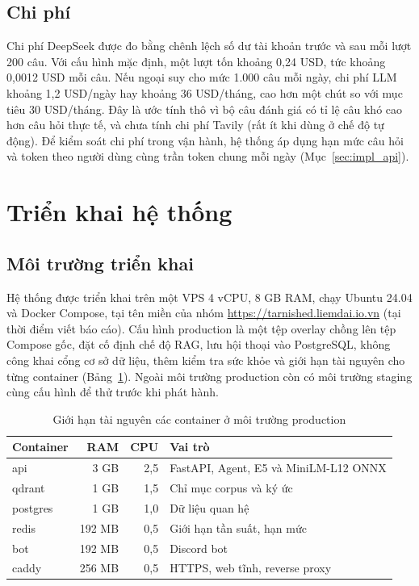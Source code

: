 \subsection{Chi phí}
\label{sec:cost}

Chi phí DeepSeek được đo bằng chênh lệch số dư tài khoản trước và sau mỗi lượt 200 câu. Với cấu hình mặc định, một lượt tốn khoảng 0,24 USD, tức khoảng 0,0012 USD mỗi câu. Nếu ngoại suy cho mức 1.000 câu mỗi ngày, chi phí LLM khoảng 1,2 USD/ngày hay khoảng 36 USD/tháng, cao hơn một chút so với mục tiêu 30 USD/tháng. Đây là ước tính thô vì bộ câu đánh giá có tỉ lệ câu khó cao hơn câu hỏi thực tế, và chưa tính chi phí Tavily (rất ít khi dùng ở chế độ tự động). Để kiểm soát chi phí trong vận hành, hệ thống áp dụng hạn mức câu hỏi và token theo người dùng cùng trần token chung mỗi ngày (Mục~\ref{sec:impl_api}).

\section{Triển khai hệ thống}
\label{sec:deploy}

\subsection{Môi trường triển khai}
\label{sec:deploy_env}

Hệ thống được triển khai trên một VPS 4 vCPU, 8 GB RAM, chạy Ubuntu 24.04 và Docker Compose, tại tên miền của nhóm \url{https://tarnished.liemdai.io.vn} (tại thời điểm viết báo cáo). Cấu hình production là một tệp overlay chồng lên tệp Compose gốc, đặt cố định chế độ RAG, lưu hội thoại vào PostgreSQL, không công khai cổng cơ sở dữ liệu, thêm kiểm tra sức khỏe và giới hạn tài nguyên cho từng container (Bảng~\ref{tab:resources}). Ngoài môi trường production còn có môi trường staging cùng cấu hình để thử trước khi phát hành.

\begin{table}[H]
    \centering
    \caption{Giới hạn tài nguyên các container ở môi trường production}
    \label{tab:resources}
    \small
    \begin{tabular}{|l|r|r|l|}
        \toprule
        \textbf{Container} & \textbf{RAM} & \textbf{CPU} & \textbf{Vai trò} \\
        \midrule
        api & 3 GB & 2,5 & FastAPI, Agent, E5 và MiniLM-L12 ONNX \\ \hline
        qdrant & 1 GB & 1,5 & Chỉ mục corpus và ký ức \\ \hline
        postgres & 1 GB & 1,0 & Dữ liệu quan hệ \\ \hline
        redis & 192 MB & 0,5 & Giới hạn tần suất, hạn mức \\ \hline
        bot & 192 MB & 0,5 & Discord bot \\ \hline
        caddy & 256 MB & 0,5 & HTTPS, web tĩnh, reverse proxy \\
        \bottomrule
    \end{tabular}
\end{table}

